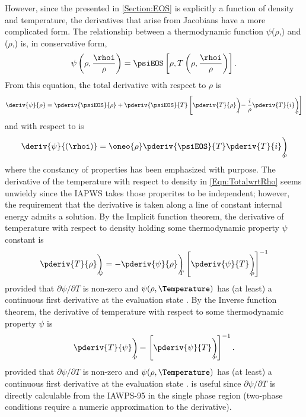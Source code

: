 However, since the \EOS presented in \cref{Section:EOS} is explicitly a function of density and temperature, the derivatives that arise from Jacobians have a more complicated form.
The relationship between a thermodynamic function $\psi$($\rho$,\IntEnergy) and \psiEOS($\rho$,\Temperature) is, in conservative form,
\begin{equation}
    \psi\left(\rho,\frac{\rhoi}{\rho}\right) = \psiEOS\left[\rho,T\left(\rho,\frac{\rhoi}{\rho}\right)\right].
\label{Eqn:PressureFunctionRelation}
\end{equation}
From this equation, the total derivative with respect to $\rho$ is
\begin{equation}
    \deriv{\psi}{\rho} = \pderiv{\psiEOS}{\rho} + 
                        \pderiv{\psiEOS}{T}    
                        \left[\pderiv{T}{\rho}\biggr)_{\!\!\!\! i} - \frac{i}{\rho}\pderiv{T}{i}\biggr)_{\!\!\!\!    \rho}\right]
    \label{Eqn:TotalwrtRho}
\end{equation}
and  with respect to \rhoi is
\begin{equation}
    \deriv{\psi}{(\rhoi)} = \oneo{\rho}\pderiv{\psiEOS}{T} \pderiv{T}{i}\biggr)_{\!\!\!\!    \rho}
    \label{Eqn:TotalwrtRhoi}
\end{equation}
where the constancy of properties has been emphasized with purpose.
The derivative of the temperature with respect to density in \cref{Eqn:TotalwrtRho} seems unwieldy since the IAPWS takes those properites to be independent; however, the requirement that the derivative is taken along a line of constant internal energy admits a solution.
By the Implicit function theorem, the derivative of temperature with respect to density holding some thermodynamic property $\psi$ constant is
\begin{equation}
    \pderiv{T}{\rho}\biggr)_{\!\!\!\! \psi} = - \pderiv{\psi}{\rho}\biggr)_{\!\!\!\! T} \left[\pderiv{\psi}{T}\biggr)_{\!\!\!\! \rho} \right]^{-1}
    \label{Eqn:dTdrho}
\end{equation}
provided that $\partial\psi/\partial{T}$ is non-zero and $\psi(\rho,\Temperature)$ has (at least) a continuous first derivative at the evaluation state \cite{greenberg_advanced_1998}.
By the Inverse function theorem, the derivative of temperature with respect to some thermodynamic property $\psi$ is
\begin{equation}
    \pderiv{T}{\psi}\biggr)_{\!\!\!\!    \rho} = \left[\pderiv{\psi}{T}\biggr)_{\!\!\!\!    \rho} \right]^{-1}.
    \label{Eqn:dTdi}
\end{equation}
provided that $\partial\psi/\partial{T}$ is non-zero and $\psi(\rho,\Temperature)$ has (at least) a continuous first derivative at the evaluation state \cite{greenberg_advanced_1998}.
 is useful since $\partial\psi/\partial{T}$ is directly calculable from the IAWPS-95 \EOS in the single phase region (two-phase conditions require a numeric approximation to the derivative).


